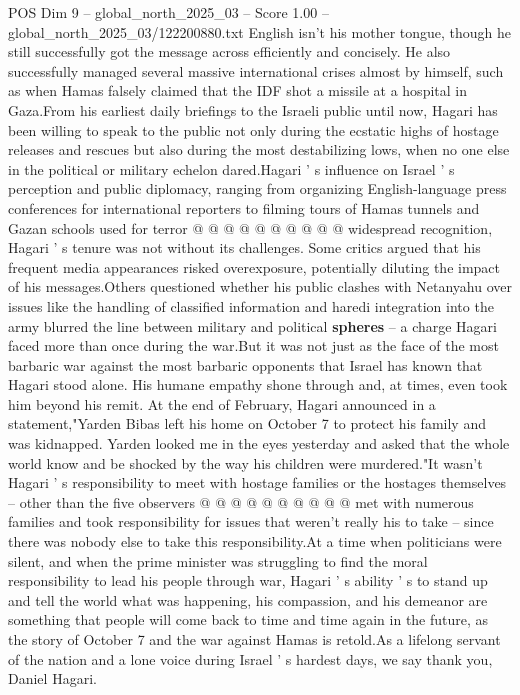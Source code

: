 \begin{textsample}{POS Dim 9 – global\_north\_2025\_03 – Score 1.00 – global\_north\_2025\_03/122200880.txt}
English isn't his mother tongue, though he still successfully got the message across efficiently and concisely.
He also successfully managed several massive international crises almost by himself, such as when Hamas falsely claimed that the IDF shot a missile at a hospital in Gaza.From his earliest daily briefings to the Israeli public until now, Hagari has been willing to speak to the public not only during the ecstatic highs of hostage releases and rescues but also during the most destabilizing lows, when no one else in the political or military echelon dared.Hagari ' s influence on Israel ' s perception and public diplomacy, ranging from organizing English-language press conferences for international reporters to filming tours of Hamas tunnels and Gazan schools used for terror @ @ @ @ @ @ @ @ @ @ widespread recognition, Hagari ' s tenure was not without its challenges.
Some critics argued that his frequent media appearances risked overexposure, potentially diluting the impact of his messages.Others questioned whether his public clashes with Netanyahu over issues like the handling of classified information and haredi integration into the army blurred the line between military and political \textbf{spheres} -- a charge Hagari faced more than once during the war.But it was not just as the face of the most barbaric war against the most barbaric opponents that Israel has known that Hagari stood alone.
His humane empathy shone through and, at times, even took him beyond his remit.
At the end of February, Hagari announced in a statement,"Yarden Bibas left his home on October 7 to protect his family and was kidnapped.
Yarden looked me in the eyes yesterday and asked that the whole world know and be shocked by the way his children were murdered."It wasn't Hagari ' s responsibility to meet with hostage families or the hostages themselves -- other than the five observers @ @ @ @ @ @ @ @ @ @ met with numerous families and took responsibility for issues that weren't really his to take -- since there was nobody else to take this responsibility.At a time when politicians were silent, and when the prime minister was struggling to find the moral responsibility to lead his people through war, Hagari ' s ability ' s to stand up and tell the world what was happening, his compassion, and his demeanor are something that people will come back to time and time again in the future, as the story of October 7 and the war against Hamas is retold.As a lifelong servant of the nation and a lone voice during Israel ' s hardest days, we say thank you, Daniel Hagari.

\end{textsample}
